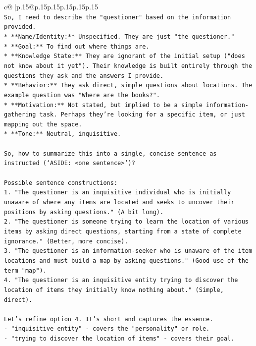 \documentclass{article}
\begin{document}
{\begin{supertabular}{c@{$\;$}|p{.15\linewidth}@{}p{.15\linewidth}p{.15\linewidth}p{.15\linewidth}p{.15\linewidth}p{.15\linewidth}}
{{{\\ 
\texttt{So, I need to describe the "questioner" based on the information provided.} \\
\texttt{*   **Name/Identity:** Unspecified. They are just "the questioner."} \\
\texttt{*   **Goal:** To find out where things are.} \\
\texttt{*   **Knowledge State:** They are ignorant of the initial setup ("does not know about it yet"). Their knowledge is built entirely through the questions they ask and the answers I provide.} \\
\texttt{*   **Behavior:** They ask direct, simple questions about locations. The example question was "Where are the books?".} \\
\texttt{*   **Motivation:** Not stated, but implied to be a simple information{-}gathering task. Perhaps they're looking for a specific item, or just mapping out the space.} \\
\texttt{*   **Tone:** Neutral, inquisitive.} \\
\\ 
\texttt{So, how to summarize this into a single, concise sentence as instructed (`ASIDE: <one sentence>`)?} \\
\\ 
\texttt{Possible sentence constructions:} \\
\texttt{1.  "The questioner is an inquisitive individual who is initially unaware of where any items are located and seeks to uncover their positions by asking questions." (A bit long).} \\
\texttt{2.  "The questioner is someone trying to learn the location of various items by asking direct questions, starting from a state of complete ignorance." (Better, more concise).} \\
\texttt{3.  "The questioner is an information{-}seeker who is unaware of the item locations and must build a map by asking questions." (Good use of the term "map").} \\
\texttt{4.  "The questioner is an inquisitive entity trying to discover the location of items they initially know nothing about." (Simple, direct).} \\
\\ 
\texttt{Let's refine option 4. It's short and captures the essence.} \\
\texttt{{-} "inquisitive entity" {-} covers the "personality" or role.} \\
\texttt{{-} "trying to discover the location of items" {-} covers their goal.} \\
}}}
\end{supertabular}}
\end{document}
